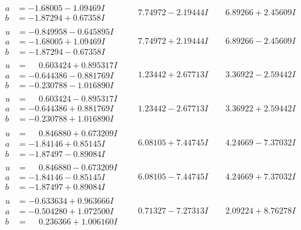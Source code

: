 \documentclass[1p]{elsarticle_modified}
\theoremstyle{definition}
\begin{document}
$$\begin{array}{c|c|c}
\begin{aligned}
a &= -1.68005 - 1.09469 I \\
b &= -1.87294 + 0.67358 I\end{aligned}
 & \phantom{-}7.74972 - 2.19444 I & \phantom{-}6.89266 + 2.45609 I \\ \hline\begin{aligned}
u &= -0.849958 - 0.645895 I \\
a &= -1.68005 + 1.09469 I \\
b &= -1.87294 - 0.67358 I\end{aligned}
 & \phantom{-}7.74972 + 2.19444 I & \phantom{-}6.89266 - 2.45609 I \\ \hline\begin{aligned}
u &= \phantom{-}0.603424 + 0.895317 I \\
a &= -0.644386 - 0.881769 I \\
b &= -0.230788 - 1.016890 I\end{aligned}
 & \phantom{-}1.23442 + 2.67713 I & \phantom{-}3.36922 - 2.59442 I \\ \hline\begin{aligned}
u &= \phantom{-}0.603424 - 0.895317 I \\
a &= -0.644386 + 0.881769 I \\
b &= -0.230788 + 1.016890 I\end{aligned}
 & \phantom{-}1.23442 - 2.67713 I & \phantom{-}3.36922 + 2.59442 I \\ \hline\begin{aligned}
u &= \phantom{-}0.846880 + 0.673209 I \\
a &= -1.84146 + 0.85145 I \\
b &= -1.87497 - 0.89084 I\end{aligned}
 & \phantom{-}6.08105 + 7.44745 I & \phantom{-}4.24669 - 7.37032 I \\ \hline\begin{aligned}
u &= \phantom{-}0.846880 - 0.673209 I \\
a &= -1.84146 - 0.85145 I \\
b &= -1.87497 + 0.89084 I\end{aligned}
 & \phantom{-}6.08105 - 7.44745 I & \phantom{-}4.24669 + 7.37032 I \\ \hline\begin{aligned}
u &= -0.633634 + 0.963666 I \\
a &= -0.504280 + 1.072500 I \\
b &= \phantom{-}0.236366 + 1.006160 I\end{aligned}
 & \phantom{-}0.71327 - 7.27313 I & \phantom{-}2.09224 + 8.76278 I \\ \hline\begin{aligned}

\end{aligned}
\end{array}$$
\end{document}
